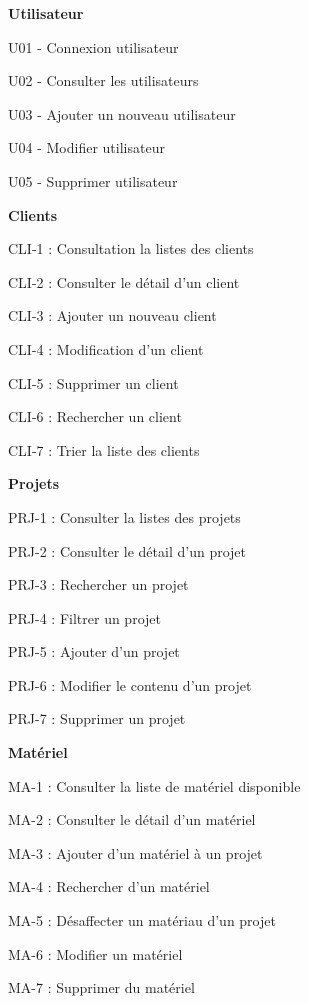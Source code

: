\textbf{Utilisateur}
\begin{todolist}
    \item[\done] U01 - Connexion utilisateur
    \item[\done] U02 - Consulter les utilisateurs
    \item[\done] U03 - Ajouter un nouveau utilisateur
    \item[\done] U04 - Modifier utilisateur
    \item[\done] U05 - Supprimer utilisateur 
\end{todolist}

\textbf{Clients}
\begin{todolist}
    \item[\done] CLI-1 : Consultation la listes des clients
    \item[\done] CLI-2 : Consulter le détail d’un client
    \item[\done] CLI-3 : Ajouter un nouveau client
    \item[\done] CLI-4 : Modification d'un client
    \item[\done] CLI-5 : Supprimer un client
    \item[\done] CLI-6 : Rechercher un client
    \item[\done] CLI-7 : Trier la liste des clients 
\end{todolist}

\textbf{Projets}
\begin{todolist}
    \item[\done] PRJ-1 : Consulter la listes des projets
    \item[\done] PRJ-2 : Consulter le détail d’un projet
    \item[\done] PRJ-3 : Rechercher un projet
    \item[\done] PRJ-4 : Filtrer un projet
    \item[\done] PRJ-5 : Ajouter d’un projet
    \item[\done] PRJ-6 : Modifier le contenu d’un projet
    \item[\done] PRJ-7 : Supprimer un projet

\end{todolist}

\textbf{Matériel}
\begin{todolist}
    \item[\done] MA-1 : Consulter la liste de matériel disponible
    \item[\done] MA-2 : Consulter le détail d’un matériel
    \item[\done] MA-3 : Ajouter d'un matériel à un projet
    \item[\done] MA-4 : Rechercher d'un matériel 
    \item[\done] MA-5 : Désaffecter un matériau d'un projet
    \item[\done] MA-6 : Modifier un matériel
    \item[\done] MA-7 : Supprimer du matériel

\end{todolist}

